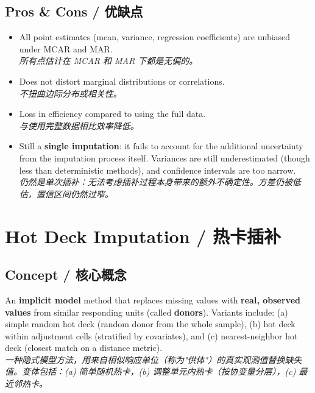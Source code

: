 \documentclass[9pt, a4paper]{article}
\begin{document}
\subsection{Pros \& Cons / 优缺点}
\begin{tcolorbox}[prosbox]
    \begin{itemize}
        \item [\ding{51}] All point estimates (mean, variance, regression coefficients) are unbiased under MCAR and MAR.\\
        \textit{所有点估计在 MCAR 和 MAR 下都是无偏的。}
        \item [\ding{51}] Does not distort marginal distributions or correlations.\\
        \textit{不扭曲边际分布或相关性。}
    \end{itemize}
\end{tcolorbox}
\begin{tcolorbox}[consbox]
    \begin{itemize}
        \item [\ding{55}] Loss in efficiency compared to using the full data.\\
        \textit{与使用完整数据相比效率降低。}
        \item [\ding{55}] Still a \textbf{single imputation}: it fails to account for the additional uncertainty from the imputation process itself. Variances are still underestimated (though less than deterministic methods), and confidence intervals are too narrow.\\
        \textit{仍然是单次插补：无法考虑插补过程本身带来的额外不确定性。方差仍被低估，置信区间仍然过窄。}
    \end{itemize}
\end{tcolorbox}

\section{Hot Deck Imputation / 热卡插补}

\subsection{Concept / 核心概念}
\begin{tcolorbox}[defbox]
    An \textbf{implicit model} method that replaces missing values with \textbf{real, observed values} from similar responding units (called \textbf{donors}). Variants include: (a) simple random hot deck (random donor from the whole sample), (b) hot deck within adjustment cells (stratified by covariates), and (c) nearest-neighbor hot deck (closest match on a distance metric).\\
    \textit{一种隐式模型方法，用来自相似响应单位（称为"供体"）的真实观测值替换缺失值。变体包括：(a) 简单随机热卡，(b) 调整单元内热卡（按协变量分层），(c) 最近邻热卡。}
\end{tcolorbox}
\end{document}
